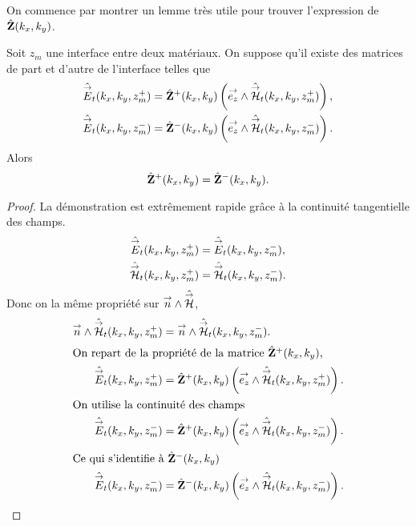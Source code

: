         On commence par montrer un lemme très utile pour trouver l'expression de \(\hat {\mathbf{Z}}(k_x,k_y)\).
        \begin{lemme}
          \label{lem:plan:continuite_impedance}
          Soit \(z_m\) une interface entre deux matériaux.
          On suppose qu'il existe des matrices de part et d'autre de l'interface telles que
          \begin{align*}
              \hat{{\overset{\rightarrow}{E}}}_t(k_x,k_y,z_m^+) &= \hat{\mathbf{Z}}^+(k_x,k_y) \left({\overset{\rightarrow}{e_z}} \wedge \hat{{\overset{\rightarrow}{\mathcal{H}}}}_t(k_x,k_y,z_m^+)\right),
              \\
              \hat{{\overset{\rightarrow}{E}}}_t(k_x,k_y,z_m^-) &= \hat{\mathbf{Z}}^-(k_x,k_y) \left({\overset{\rightarrow}{e_z}} \wedge \hat{{\overset{\rightarrow}{\mathcal{H}}}}_t(k_x,k_y,z_m^-)\right).
          \end{align*}
          Alors
          \begin{equation*}
          \hat {\mathbf{Z}}^+(k_x,k_y) = \hat {\mathbf{Z}}^-(k_x,k_y).
          \end{equation*}
        \end{lemme}


        \begin{proof}
          La démonstration est extrêmement rapide grâce à la continuité tangentielle des champs.
          \begin{align*}
            \hat{{\overset{\rightarrow}{E}}}_t(k_x,k_y,z_m^+) &= \hat{{\overset{\rightarrow}{E}}}_t(k_x,k_y,z_m^-),
            \\
            \hat{{\overset{\rightarrow}{\mathcal{H}}}}_t(k_x,k_y,z_m^+) &= \hat{{\overset{\rightarrow}{\mathcal{H}}}}_t(k_x,k_y,z_m^-).
          \end{align*}
          Donc on la même propriété sur \({\overset{\rightarrow}{n}} \wedge \hat{{\overset{\rightarrow}{\mathcal{H}}}}\),
          \begin{align*}                
            {\overset{\rightarrow}{n}} \wedge \hat{{\overset{\rightarrow}{\mathcal{H}}}}_t(k_x,k_y,z_m^+) &= {\overset{\rightarrow}{n}} \wedge \hat{{\overset{\rightarrow}{\mathcal{H}}}}_t(k_x,k_y,z_m^-).
            \\
            \intertext{On repart de la propriété de la matrice \(\hat{\mathbf{Z}}^+(k_x,k_y)\),}
            \hat{{\overset{\rightarrow}{E}}}_t(k_x,k_y,z_m^+) &= \hat{\mathbf{Z}}^+(k_x,k_y) \left({\overset{\rightarrow}{e_z}} \wedge \hat{{\overset{\rightarrow}{\mathcal{H}}}}_t(k_x,k_y,z_m^+)\right).
            \\
            \intertext{On utilise la continuité des champs}
            \hat{{\overset{\rightarrow}{E}}}_t(k_x,k_y,z_m^-) &= \hat{\mathbf{Z}}^+(k_x,k_y) \left({\overset{\rightarrow}{e_z}} \wedge \hat{{\overset{\rightarrow}{\mathcal{H}}}}_t(k_x,k_y,z_m^-)\right).
            \\
            \intertext{Ce qui s'identifie à \(\hat{\mathbf{Z}}^-(k_x,k_y)\)}
            \hat{{\overset{\rightarrow}{E}}}_t(k_x,k_y,z_m^-) &= \hat{\mathbf{Z}}^-(k_x,k_y) \left({\overset{\rightarrow}{e_z}} \wedge \hat{{\overset{\rightarrow}{\mathcal{H}}}}_t(k_x,k_y,z_m^-)\right).
          \end{align*}
        \end{proof}

